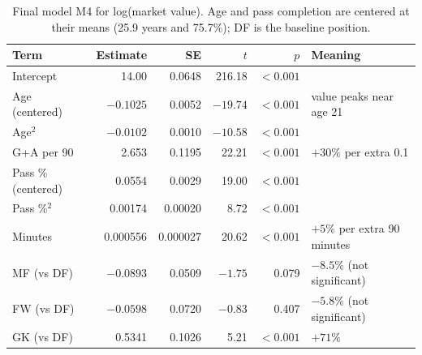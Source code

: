 \documentclass[11pt]{article}
\begin{document}
\begin{table}[!htb]
    \centering
    \caption{Final model M4 for log(market value). Age and pass completion are centered at their means (25.9 years and 75.7\%); DF is the baseline position.}
    \label{tab:coef}
    \small
    \begin{tabular}{lrrrrl}
        \toprule
        Term               & Estimate  & SE       & $t$      & $p$       & Meaning                     \\
        \midrule
        Intercept          & 14.00     & 0.0648   & 216.18   & $< 0.001$ &                             \\
        Age (centered)     & $-0.1025$ & 0.0052   & $-19.74$ & $< 0.001$ & value peaks near age 21     \\
        Age$^2$            & $-0.0102$ & 0.0010   & $-10.58$ & $< 0.001$ &                             \\
        G+A per 90         & 2.653     & 0.1195   & 22.21    & $< 0.001$ & $+30\%$ per extra 0.1       \\
        Pass \% (centered) & 0.0554    & 0.0029   & 19.00    & $< 0.001$ &                             \\
        Pass \%$^2$        & 0.00174   & 0.00020  & 8.72     & $< 0.001$ &                             \\
        Minutes            & 0.000556  & 0.000027 & 20.62    & $< 0.001$ & $+5\%$ per extra 90 minutes \\
        MF (vs DF)         & $-0.0893$ & 0.0509   & $-1.75$  & 0.079     & $-8.5\%$ (not significant)  \\
        FW (vs DF)         & $-0.0598$ & 0.0720   & $-0.83$  & 0.407     & $-5.8\%$ (not significant)  \\
        GK (vs DF)         & 0.5341    & 0.1026   & 5.21     & $< 0.001$ & $+71\%$                     \\
        \bottomrule
    \end{tabular}
\end{table}
\end{document}

